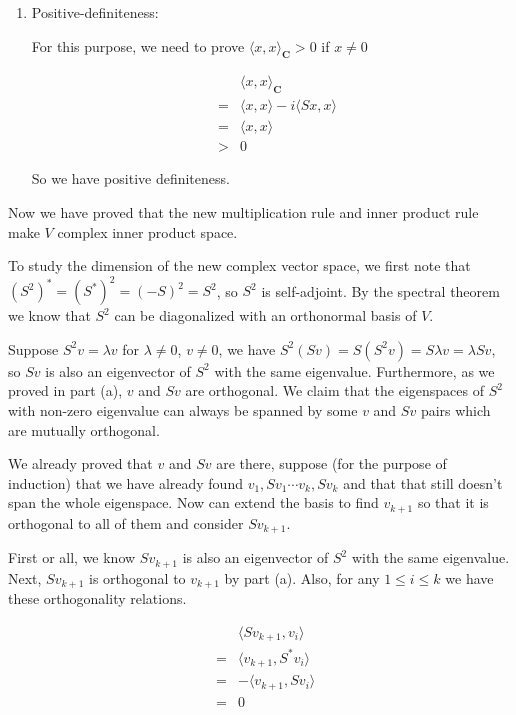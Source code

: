 \begin{enumerate}
{        So the left hand side and the right hand side equals and we have the linearity in the first argument.
    }
    \item{
        Positive-definiteness:

        For this purpose, we need to prove $ \langle x, x\rangle_\mathbf{C} > 0 $ if $ x \ne 0 $

        \begin{eqnarray*}
          & & \langle x, x\rangle_\mathbf{C} \\
          &=& \langle x, x\rangle - i \langle Sx, x\rangle \\
          &=& \langle x, x\rangle \\
          &>& 0
        \end{eqnarray*}

        So we have positive definiteness.
    }
\end{enumerate}

Now we have proved that the new multiplication rule and inner product rule make $ V $ complex inner product space.

To study the dimension of the new complex vector space, we first note that $ (S^2)^* = (S^*)^2 = (-S)^2 = S^2 $, so $ S^2 $ is self-adjoint. By the spectral theorem we know that $ S^2 $ can be diagonalized with an orthonormal basis of $ V $.

Suppose $ S^2 v = \lambda v $ for $ \lambda \ne 0$, $ v \ne 0 $, we have $ S^2(Sv) = S(S^2v) = S \lambda v 
 = \lambda Sv $, so $ Sv $ is also an eigenvector of $ S^2 $ with the same eigenvalue. Furthermore, as we proved in part (a), $ v $ and $ Sv $ are orthogonal. We claim that the eigenspaces of $ S^2 $ with non-zero eigenvalue can always be spanned by some $ v $ and $ Sv $ pairs which are mutually orthogonal.

We already proved that $ v $ and $ Sv $ are there, suppose (for the purpose of induction) that we have already found $ v_1,  Sv_1 \cdots v_k, Sv_k $ and that that still doesn't span the whole eigenspace. Now can extend the basis to find $ v_{k+1} $ so that it is orthogonal to all of them and consider $ Sv_{k+1} $.

First or all, we know $ Sv_{k+1} $ is also an eigenvector of $ S^2 $ with the same eigenvalue. Next, $ Sv_{k+1} $ is orthogonal to $ v_{k+1} $ by part (a). Also, for any $ 1 \le i \le k $ we have these orthogonality relations.

\begin{eqnarray*}
  & & \langle Sv_{k+1}, v_i \rangle \\
  &=& \langle v_{k+1}, S^* v_i \rangle \\
  &=& -\langle v_{k+1}, S v_i \rangle \\
  &=& 0
\end{eqnarray*}


